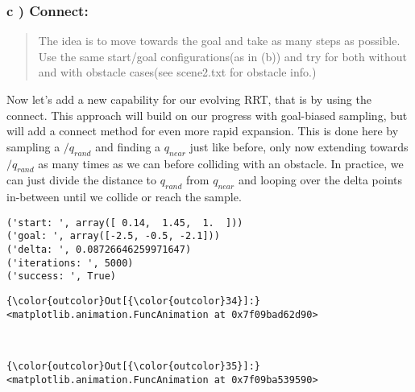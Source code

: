 \documentclass{article}
\begin{document}
    \subsubsection{c ) Connect:}


    \begin{quote}
The idea is to move towards the goal and take as many steps as possible.
Use the same start/goal configurations(as in (b)) and try for both
without and with obstacle cases(see scene2.txt for obstacle info.)
\end{quote}

    Now let's add a new capability for our evolving RRT, that is by using
the connect. This approach will build on our progress with goal-biased
sampling, but will add a connect method for even more rapid expansion.
This is done here by sampling a $/q_{rand}$ and finding a $q_{near}$
just like before, only now extending towards $/q_{rand}$ as many times
as we can before colliding with an obstacle. In practice, we can just
divide the distance to $q_{rand}$ from $q_{near}$ and looping over the
delta points in-between until we collide or reach the sample.



    \begin{Verbatim}[commandchars=\\\{\}]
('start: ', array([ 0.14,  1.45,  1.  ]))
('goal: ', array([-2.5, -0.5, -2.1]))
('delta: ', 0.08726646259971647)
('iterations: ', 5000)
('success: ', True)
    \end{Verbatim}



            \begin{Verbatim}[commandchars=\\\{\}]
{\color{outcolor}Out[{\color{outcolor}34}]:} <matplotlib.animation.FuncAnimation at 0x7f09bad62d90>
\end{Verbatim}
        
    \begin{center}
    \end{center}
    { \hspace*{\fill} \\}
    

            \begin{Verbatim}[commandchars=\\\{\}]
{\color{outcolor}Out[{\color{outcolor}35}]:} <matplotlib.animation.FuncAnimation at 0x7f09ba539590>
\end{Verbatim}
        
\end{document}
